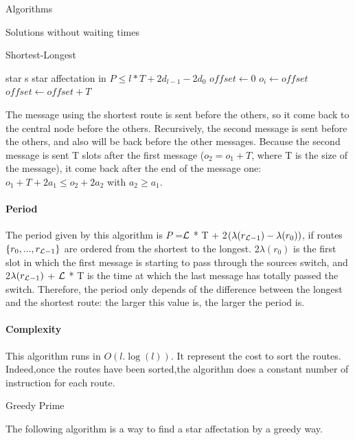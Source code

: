 \documentclass[a4paper,10pt]{report}
\begin{document}
\begin{chapter}{Algorithms}
\begin{section}{Solutions without waiting times}
\begin{subsection}{Shortest-Longest}
\begin{algorithm}[H]
\caption{Star affectation from shortest to longest}
\begin{algorithmic}

\REQUIRE star s
\ENSURE star affectation in $P \le l*T + 2d_{l-1} - 2d_0$
\STATE $offset \leftarrow 0$
\STATE $o_i \leftarrow offset$
\STATE $offset \leftarrow offset+T$
\ENDFOR

\end{algorithmic}
\end{algorithm}


The message using the shortest route is sent before the others, so it come back to the central node before the others.
Recursively, the second message is sent before the others, and also will be back before the other messages. 
Because the second message is sent T slots after the first message ($o_2 = o_1 + T$, where T is the size of the message), it come back after
the end of the message one: $o_1+ T + 2a_1 \le o_2 + 2a_2$ with $a_2 \ge a_1$.

\paragraph{Period}
The period given by this algorithm is $P$ =${\cal L}$ * T + 2$(\lambda(r_{{\cal L}-1}) - \lambda(r_0))$, if routes $\{r_0,...,r_{{\cal L}-1}\}$ are ordered
from the shortest to the longest. 2$\lambda(r_0)$ is the first slot in which the first message is starting to pass through the sources switch,
and 2$\lambda(r_{{\cal L}-1})$ + ${\cal L}$ * T  is the time at which the last message has totally passed the switch.
Therefore, the period only depends of the difference between the longest and the shortest route: the larger this value is, the larger
the period is.

\paragraph{Complexity}
This algorithm runs in $O(l.\log(l))$. It represent the cost to sort the routes.
Indeed,once the routes have been sorted,the algorithm does a constant number of instruction for each route.
\end{subsection}

\begin{subsection}{Greedy Prime}

The following algorithm is a way to find a star affectation by a greedy way.


\end{subsection}
\end{section}
\end{chapter}
\end{document}
